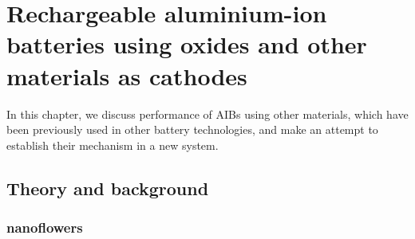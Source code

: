 
\chapter{Rechargeable aluminium-ion batteries using oxides and other materials as cathodes} %
In this chapter, we discuss performance of AIBs using other materials, which have been previously used in other battery technologies, and make an attempt to establish their mechanism in a new system.
\label{chap6} %


\newcommand{\keyword}[1]{\textbf{#1}}
\newcommand{\tabhead}[1]{\textbf{#1}}
\newcommand{\code}[1]{\texttt{#1}}
\newcommand{\file}[1]{\texttt{\bfseries#1}}
\newcommand{\option}[1]{\texttt{\itshape#1}}

\section{Theory and background}
\subsection*{ nanoflowers}
